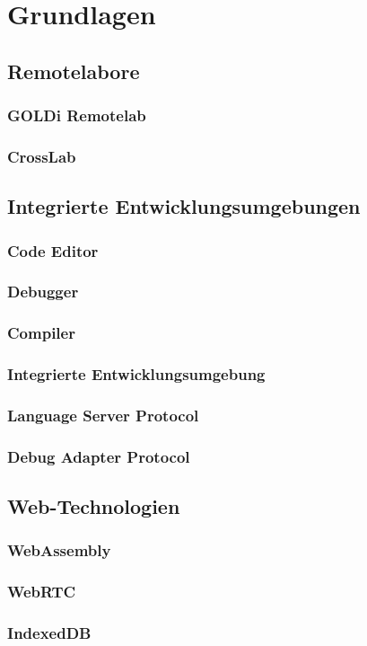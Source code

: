 \chapter{Grundlagen} \label{grundlagen}

\section{Remotelabore}

\subsection{GOLDi Remotelab}

\subsection{CrossLab}

\section{Integrierte Entwicklungsumgebungen}

\subsection{Code Editor}

\subsection{Debugger}

\subsection{Compiler}

\subsection{Integrierte Entwicklungsumgebung}

\subsection{Language Server Protocol}

\subsection{Debug Adapter Protocol}

\section{Web-Technologien}

\subsection{WebAssembly}

\subsection{WebRTC}

\subsection{IndexedDB}